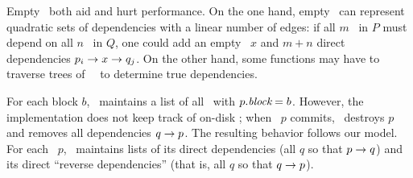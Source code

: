 Empty \patches\ both aid and hurt performance.
%
On the one hand, empty \patches\ can represent quadratic sets of dependencies
 with a linear number of edges: if all $m$ \patches\ in $P$ must depend on
 all $n$ \patches\ in $Q$, one could 
 add an empty \patch\ $x$ and $m+n$ direct dependencies
 $p_i \rightarrow x \rightarrow q_j$.
%
On the other hand, some functions may have to traverse trees of \noop\
 \chdescs\ to determine true dependencies.


\begin{comment}
To solve this problem, we introduce an additional type of \chdesc. The
prototypical \chdesc\ corresponds to some change on disk, but \Kudos\ also
supports \aemphnoop\ \chdesc\ type, which doesn't change the disk at all.
\Noop\ \chdescs\ can have \befores, like other \chdescs, but they don't need to
be written to disk: they are trivially satisfied when all of their \befores\ are
satisfied. Thus, they can be used to ``stand for'' entire sets of other changes.
%
This capability is extremely useful, and is used by most operations on disk
structures so that a single \chdesc\ can be returned that depends on the whole
change. Likewise, \anoop\ \chdesc\ can be passed in as a parameter to a disk
operation to make the whole operation depend on a set of other changes. \Noop\
\chdescs\ allow dependencies between sets with only a linear number of
dependency edges in the \chdesc\ graph, and without having to pass around arrays
of \chdescs.
%
The cost is that some functions may have to traverse trees of \noop\ \chdescs\
to determine true dependencies.
\end{comment}


For each block $b$, \Kudos\ maintains a list of all \patches\ with
$p.\textit{block} = b$.
%
However, the implementation does not keep track of on-disk \patches; when
\patch\ $p$ commits, \Kudos\ destroys $p$ and removes all dependencies $q
\rightarrow p$.
%
The resulting behavior follows our model.
%
For each \patch\ $p$, \Kudos\ maintains lists of its direct dependencies (all
$q$ so that $p \rightarrow q$) and its direct ``reverse dependencies'' (that
is, all $q$ so that $q \rightarrow p$).
